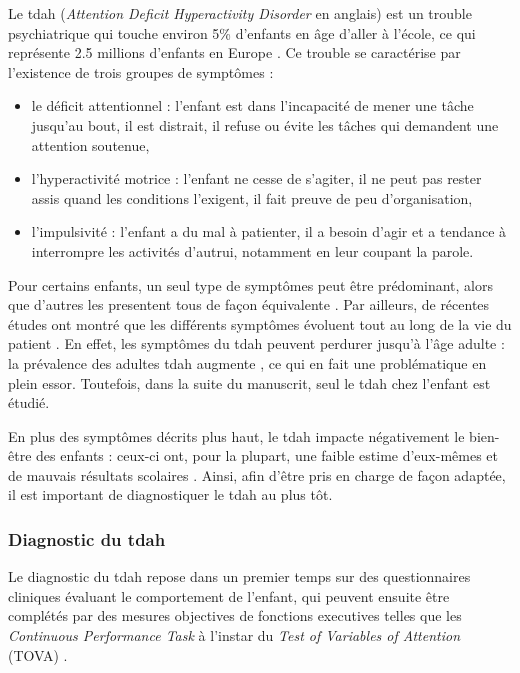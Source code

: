 Le \gls{tdah} (\textit{Attention Deficit Hyperactivity Disorder} en anglais) est un trouble psychiatrique qui touche environ 5\% d'enfants en âge d'aller à l'école, 
ce qui représente 2.5 millions d'enfants en Europe \citep{DSM-5}. Ce trouble se caractérise par l'existence de trois groupes de symptômes \citep{HAS} : 
\begin{itemize}
\item le déficit attentionnel : l'enfant est dans l'incapacité de mener une tâche jusqu'au bout, il est distrait, il refuse ou évite les tâches qui demandent
une attention soutenue,
\item l'hyperactivité motrice : l'enfant ne cesse de s'agiter, il ne peut pas rester assis quand les conditions l'exigent, il fait preuve de peu d'organisation,
\item l'impulsivité : l'enfant a du mal à patienter, il a besoin d'agir et a tendance à interrompre les activités d'autrui, notamment en leur coupant la parole.
\end{itemize}
Pour certains enfants, un seul type de symptômes peut être prédominant, alors que d'autres les presentent tous de façon équivalente \citep{DSM-5}. Par ailleurs, de récentes 
études ont montré que les différents symptômes évoluent tout au long de la vie du patient \citep{CFDCAP, Epstein2013}. En effet, les symptômes du \gls{tdah}
peuvent perdurer jusqu'à l'âge adulte \citep{Faraone2006} : la prévalence des adultes \gls{tdah} augmente \citep{Chung2019}, ce qui en fait une problématique
en plein essor. Toutefois, dans la suite du manuscrit, seul le \gls{tdah} chez l'enfant est étudié. 

En plus des symptômes décrits plus haut, le \gls{tdah} impacte négativement le bien-être des enfants : ceux-ci ont, pour la plupart, une faible estime d'eux-mêmes 
\citep{Shaw2005} et de mauvais résultats scolaires \citep{Barry2002}. Ainsi, afin d'être pris en charge de façon adaptée, il est important de diagnostiquer 
le \gls{tdah} au plus tôt. 

\subsubsection{Diagnostic du \gls{tdah}}

Le diagnostic du \gls{tdah} repose dans un premier temps sur des questionnaires cliniques évaluant le comportement de l'enfant, qui peuvent ensuite être
complétés par des mesures objectives de fonctions executives telles que les \textit{Continuous Performance Task} \citep{Barkley1991} à l'instar du 
\textit{Test of Variables of Attention} (TOVA) \citep{Forbes1998}.


